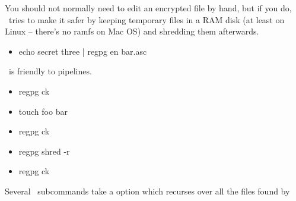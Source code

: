{  You should not normally need to edit an encrypted file by hand, but
  if you do, \regpg\ tries to make it safer by keeping temporary files
  in a RAM disk (at least on Linux -- there's no ramfs on Mac OS) and
  shredding them afterwards.

  \begin{itemize}
  \item echo secret three | regpg en bar.asc
  \end{itemize}

  \regpg\ is friendly to pipelines.

  \begin{itemize}
  \item regpg ck
  \item touch foo bar
  \item regpg ck
  \item regpg shred -r
  \item regpg ck
  \end{itemize}

  Several \regpg\ subcommands take a  option which recurses
  over all the files found by 

}



